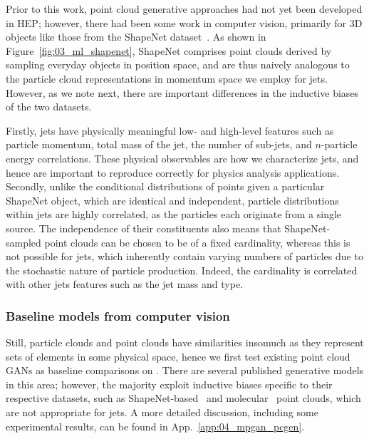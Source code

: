 Prior to this work, point cloud generative approaches had not yet been developed in HEP; however, there had been some work in computer vision, primarily for 3D objects like those from the ShapeNet dataset~\cite{shapenet}.
As shown in Figure~\ref{fig:03_ml_shapenet}, ShapeNet comprises point clouds derived by sampling everyday objects in position space, and are thus naively analogous to the particle cloud representations in momentum space we employ for jets.
However, as we note next, there are important differences in the inductive biases of the two datasets.

Firstly, jets have physically meaningful low- and high-level features such as particle momentum, total mass of the jet, the number of sub-jets, and $n$-particle energy correlations. 
These physical observables are how we characterize jets, and hence are important to reproduce correctly for physics analysis applications. 
Secondly, unlike the conditional distributions of points given a particular ShapeNet object, which are identical and independent, particle distributions within jets are highly correlated, as the particles each originate from a single source.
The independence of their constituents also means that ShapeNet-sampled point clouds can be chosen to be of a fixed cardinality, whereas this is not possible for jets, which inherently contain varying numbers of particles due to the stochastic nature of particle production.
Indeed, the cardinality is correlated with other jets features such as the jet mass and type.

\subsubsection{Baseline models from computer vision}

Still, particle clouds and point clouds have similarities insomuch as they represent sets of elements in some physical space, hence we first test existing point cloud GANs as baseline comparisons on \jetnet. 
There are several published generative models in this area; however, the majority exploit inductive biases specific to their respective datasets, such as ShapeNet-based~\cite{pcgan,pointflow,discretepointflow,ShapeGF} and molecular~\cite{kohler20,simm21,gschnet} point clouds, which are not appropriate for jets.
A more detailed discussion, including some experimental results, can be found in App.~\ref{app:04_mpgan_pcgen}. 

